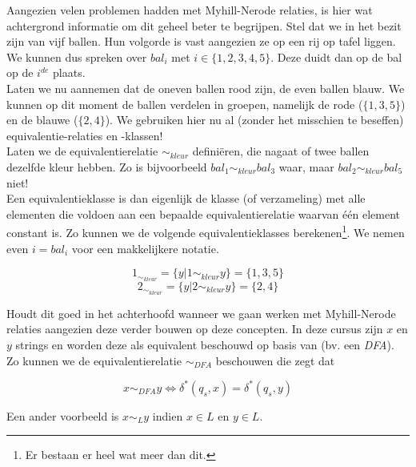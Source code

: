 \documentclass[10pt,a4paper]{article}
\begin{document}
	Aangezien velen problemen hadden met Myhill-Nerode relaties, is hier wat achtergrond informatie om dit geheel beter te begrijpen. Stel dat we in het bezit zijn van vijf ballen. Hun volgorde is vast aangezien ze op een rij op tafel liggen. We kunnen dus spreken over $bal_i$ met $i \in \{1,2,3,4,5\}$. Deze duidt dan op de bal op de $i^{de}$ plaats.\\

	Laten we nu aannemen dat de oneven ballen rood zijn, de even ballen blauw. We kunnen op dit moment de ballen verdelen in groepen, namelijk de rode ($\{1,3,5\}$) en de blauwe ($\{2,4\}$). We gebruiken hier nu al (zonder het misschien te beseffen) equivalentie-relaties en -klassen!\\

	Laten we de equivalentierelatie $\sim_{kleur}$ defini\"eren, die nagaat of twee ballen dezelfde kleur hebben. Zo is bijvoorbeeld $bal_1 \sim_{kleur} bal_3$ waar, maar $bal_2 \sim_{kleur} bal_5$ niet!\\

	Een equivalentieklasse is dan eigenlijk de klasse (of verzameling) met alle elementen die voldoen aan een bepaalde equivalentierelatie waarvan \'e\'en element constant is. Zo kunnen we de volgende equivalentieklasses berekenen\footnote{Er bestaan er heel wat meer dan dit.}. We nemen even $i = bal_i$ voor een makkelijkere notatie.

	$$1_{\sim_{kleur}} = \{y|1 \sim_{kleur} y\} = \{1,3,5\}$$
	$$2_{\sim_{kleur}} = \{y|2 \sim_{kleur} y\} = \{2,4\}$$

	Houdt dit goed in het achterhoofd wanneer we gaan werken met Myhill-Nerode relaties aangezien deze verder bouwen op deze concepten. In deze cursus zijn $x$ en $y$ strings en worden deze als equivalent beschouwd op basis van (bv. een \emph{DFA}). Zo kunnen we de equivalentierelatie $\sim_{DFA}$ beschouwen die zegt dat

	$$x \sim_{DFA} y \iff \delta^*(q_s,x) = \delta^*(q_s,y)$$

	Een ander voorbeeld is $x \sim_L y$ indien $x \in L$ en $y \in L$.


\newpage











\end{document}
